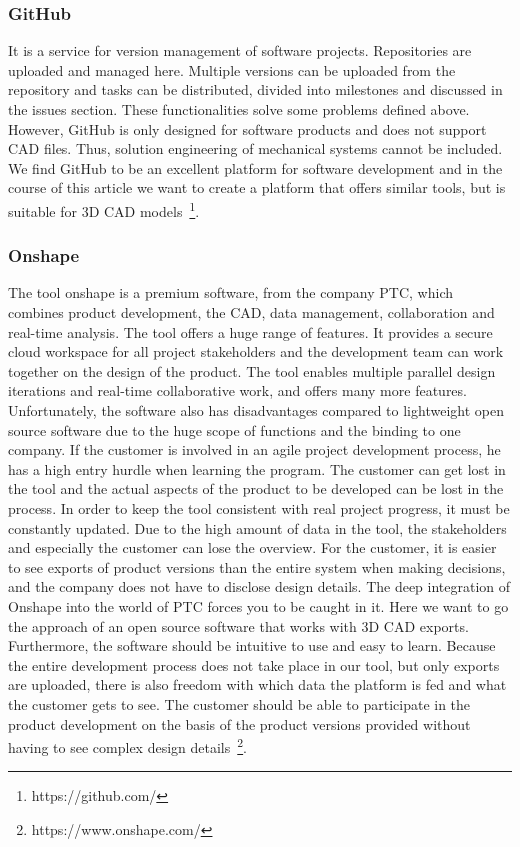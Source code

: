     \subsubsection*{GitHub}
    It is a service for version management of software projects. Repositories are uploaded and managed here. Multiple versions can be uploaded from the repository and tasks can be distributed, divided into milestones and discussed in the issues section. These functionalities solve some problems defined above. However, GitHub is only designed for software products and does not support CAD files. Thus, solution engineering of mechanical systems cannot be included. We find GitHub to be an excellent platform for software development and in the course of this article we want to create a platform that offers similar tools, but is suitable for 3D CAD models~\footnote{https://github.com/}.

    \subsubsection*{Onshape}
    The tool onshape is a premium software, from the company PTC, which combines product development, the CAD, data management, collaboration and real-time analysis. The tool offers a huge range of features. It provides a secure cloud workspace for all project stakeholders and the development team can work together on the design of the product. The tool enables multiple parallel design iterations and real-time collaborative work, and offers many more features. 
    Unfortunately, the software also has disadvantages compared to lightweight open source software due to the huge scope of functions and the binding to one company. If the customer is involved in an agile project development process, he has a high entry hurdle when learning the program. The customer can get lost in the tool and the actual aspects of the product to be developed can be lost in the process. In order to keep the tool consistent with real project progress, it must be constantly updated. Due to the high amount of data in the tool, the stakeholders and especially the customer can lose the overview. For the customer, it is easier to see exports of product versions than the entire system when making decisions, and the company does not have to disclose design details. The deep integration of Onshape into the world of PTC forces you to be caught in it. 
    Here we want to go the approach of an open source software that works with 3D CAD exports. Furthermore, the software should be intuitive to use and easy to learn. Because the entire development process does not take place in our tool, but only exports are uploaded, there is also freedom with which data the platform is fed and what the customer gets to see. The customer should be able to participate in the product development on the basis of the product versions provided without having to see complex design details~\footnote{https://www.onshape.com/}.

